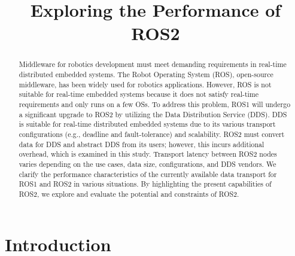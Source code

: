 \documentclass{sig-alternate-05-2015}
\title{Exploring the Performance of ROS2}
\begin{document}
\maketitle

\setcounter{topnumber}{5}%
\def\topfraction{1.00}%
\setcounter{bottomnumber}{5}%
\def\bottomfraction{1.00}%
\setcounter{totalnumber}{10}%
\def\textfraction{0.00}%


\begin{abstract}
  Middleware for robotics development must meet demanding requirements in real-time distributed embedded systems. 
  The Robot Operating System (ROS), open-source middleware, has been widely used for robotics applications.
  However, ROS is not suitable for real-time embedded systems because it does not satisfy real-time requirements and only runs on a few OSs.
  To address this problem, ROS1 will undergo a significant upgrade to ROS2 by utilizing the Data Distribution Service (DDS).
  DDS is suitable for real-time distributed embedded systems due to its various transport configurations (e.g., deadline and fault-tolerance) and scalability.
  ROS2 must convert data for DDS and abstract DDS from its users; however, this incurs additional overhead, which is examined in this study.
  Transport latency between ROS2 nodes varies depending on the use cases, data size, configurations, and DDS vendors. 
  We clarify the performance characteristics of the currently available data transport for ROS1 and ROS2 in various situations.
  By highlighting the present capabilities of ROS2, we explore and evaluate the potential and constraints of ROS2.
\end{abstract}


\section{Introduction}
\label{sec:orgheadline5}
\end{document}
